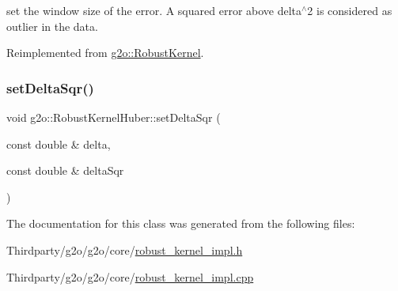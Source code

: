 set the window size of the error. A squared error above delta$^\wedge$2 is considered as outlier in the data. 

Reimplemented from \mbox{\hyperlink{classg2o_1_1_robust_kernel_a8d85269635c436fca51324d7cb16a798}{g2o\+::\+Robust\+Kernel}}.

\mbox{\label{classg2o_1_1_robust_kernel_huber_ad243b5888d71a3573e9f9372abead870}} 
\subsubsection{\texorpdfstring{set\+Delta\+Sqr()}{setDeltaSqr()}}
{\footnotesize\ttfamily void g2o\+::\+Robust\+Kernel\+Huber\+::set\+Delta\+Sqr (\begin{DoxyParamCaption}\item[{const double \&}]{delta,  }\item[{const double \&}]{delta\+Sqr }\end{DoxyParamCaption})\hspace{0.3cm}{\ttfamily [virtual]}}



The documentation for this class was generated from the following files\+:\begin{DoxyCompactItemize}
\item 
Thirdparty/g2o/g2o/core/\mbox{\hyperlink{robust__kernel__impl_8h}{robust\+\_\+kernel\+\_\+impl.\+h}}\item 
Thirdparty/g2o/g2o/core/\mbox{\hyperlink{robust__kernel__impl_8cpp}{robust\+\_\+kernel\+\_\+impl.\+cpp}}\end{DoxyCompactItemize}
